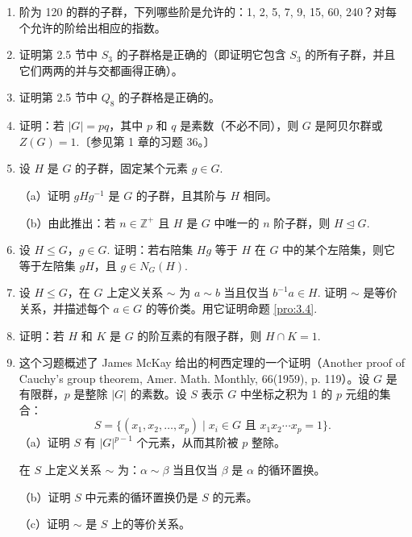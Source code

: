 \begin{enumerate}
\item 阶为 120 的群的子群，下列哪些阶是允许的：1, 2, 5, 7, 9, 15, 60, 240？对每个允许的阶给出相应的指数。

\item 证明第 2.5 节中 \(S_3\) 的子群格是正确的（即证明它包含 \(S_3\) 的所有子群，并且它们两两的并与交都画得正确）。

\item 证明第 2.5 节中 \(Q_8\) 的子群格是正确的。

\item 证明：若 \(|G| = pq\)，其中 \(p\) 和 \(q\) 是素数（不必不同），则 \(G\) 是阿贝尔群或 \(Z(G) = 1\).〔参见第 1 章的习题 36。〕

\item 设 \(H\) 是 \(G\) 的子群，固定某个元素 \(g \in G\).

（a）证明 \(gHg^{-1}\) 是 \(G\) 的子群，且其阶与 \(H\) 相同。

（b）由此推出：若 \(n \in \mathbb{Z}^+\) 且 \(H\) 是 \(G\) 中唯一的 \(n\) 阶子群，则 \(H \trianglelefteq G\).

\item 设 \(H \leq G\)，\(g \in G\). 证明：若右陪集 \(Hg\) 等于 \(H\) 在 \(G\) 中的某个左陪集，则它等于左陪集 \(gH\)，且 \(g \in N_G(H)\).

\item 设 \(H \leq G\)，在 \(G\) 上定义关系 \(\sim\) 为 \(a \sim b\) 当且仅当 \(b^{-1}a \in H\). 证明 \(\sim\) 是等价关系，并描述每个 \(a \in G\) 的等价类。用它证明命题 \ref{pro:3.4}.

\item 证明：若 \(H\) 和 \(K\) 是 \(G\) 的阶互素的有限子群，则 \(H \cap K = 1\).

\item 这个习题概述了 James McKay 给出的柯西定理的一个证明（Another proof of Cauchy's group theorem, Amer. Math. Monthly, 66(1959), p. 119）。设 \(G\) 是有限群，\(p\) 是整除 \(|G|\) 的素数。设 \(S\) 表示 \(G\) 中坐标之积为 1 的 \(p\) 元组的集合：
\[
S = \{(x_1, x_2, \ldots, x_p) \mid x_i \in G \text{ 且 } x_1 x_2 \cdots x_p = 1\}.
\]
（a）证明 \(S\) 有 \(|G|^{p-1}\) 个元素，从而其阶被 \(p\) 整除。

在 \(S\) 上定义关系 \(\sim\) 为：\(\alpha \sim \beta\) 当且仅当 \(\beta\) 是 \(\alpha\) 的循环置换。

（b）证明 \(S\) 中元素的循环置换仍是 \(S\) 的元素。

（c）证明 \(\sim\) 是 \(S\) 上的等价关系。


\end{enumerate}
